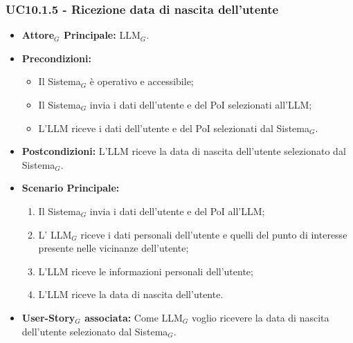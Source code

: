 \documentclass[10pt]{article}
\begin{document}
\begin{justify}
\subsubsection{\textbf{UC10.1.5 - Ricezione data di nascita dell'utente}}
\begin{itemize}
    \item \textbf{Attore$_G$ Principale:} LLM$_G$.
    \item \textbf{Precondizioni:} 
        \begin{itemize}
          \item Il Sistema$_G$ è operativo e accessibile;
          \item Il Sistema$_G$ invia i dati dell'utente e del PoI selezionati all'LLM;
            \item L'LLM riceve i dati dell'utente e del PoI selezionati dal Sistema$_G$.
        \end{itemize}
      \item \textbf{Postcondizioni:} L'LLM riceve la data di nascita dell'utente selezionato dal Sistema$_G$.
    \item \textbf{Scenario Principale:} 
        \begin{enumerate}
          \item Il Sistema$_G$ invia i dati dell'utente e del PoI all'LLM;
        \item L' LLM$_G$ riceve i dati personali dell'utente e quelli del punto di interesse presente nelle vicinanze dell'utente;
          \item L'LLM riceve le informazioni personali dell'utente;
          \item L'LLM riceve la data di nascita dell'utente.
        \end{enumerate}
      \item \textbf{User-Story$_G$ associata:} Come LLM$_G$ voglio ricevere la data di nascita dell'utente selezionato dal Sistema$_G$.
\end{itemize}

\end{justify}
\end{document}
